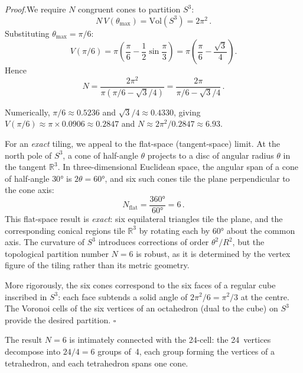 \documentclass[amsmath,amssymb,aps,prd,twocolumn,superscriptaddress,nofootinbib]{revtex4-2}
\begin{document}
\noindent\emph{Proof.}\quad  We require $N$ congruent cones to partition $S^3$:
\begin{equation}\label{eq:Ncones}
  N\, V(\theta_{\max}) = \mathrm{Vol}(S^3) = 2\pi^2\,.
\end{equation}
Substituting $\theta_{\max} = \pi/6$:
\begin{equation}\label{eq:V30}
  V(\pi/6) = \pi\!\left(\frac{\pi}{6}
  - \frac{1}{2}\sin\frac{\pi}{3}\right)
  = \pi\!\left(\frac{\pi}{6} - \frac{\sqrt{3}}{4}\right).
\end{equation}
Hence
\begin{equation}\label{eq:Nformula}
  N = \frac{2\pi^2}{\pi(\pi/6 - \sqrt{3}/4)}
    = \frac{2\pi}{\pi/6 - \sqrt{3}/4}\,.
\end{equation}

Numerically, $\pi/6 \approx 0.5236$ and $\sqrt{3}/4 \approx 0.4330$, giving
$V(\pi/6) \approx \pi \times 0.0906 \approx 0.2847$ and
$N \approx 2\pi^2/0.2847 \approx 6.93$.

For an \emph{exact} tiling, we appeal to the flat-space (tangent-space) limit.
At the north pole of $S^3$, a cone of half-angle $\theta$ projects to a disc
of angular radius $\theta$ in the tangent $\mathbb{R}^3$.  In three-dimensional
Euclidean space, the angular span of a cone of half-angle $30°$ is
$2\theta = 60°$, and six such cones tile the plane perpendicular to the cone
axis:
\begin{equation}\label{eq:flat}
  N_{\text{flat}} = \frac{360°}{60°} = 6\,.
\end{equation}
This flat-space result is \emph{exact}: six equilateral triangles tile the
plane, and the corresponding conical regions tile $\mathbb{R}^3$ by rotating
each by $60°$ about the common axis.  The curvature of $S^3$ introduces
corrections of order $\theta^2/R^2$, but the topological partition number
$N = 6$ is robust, as it is determined by the vertex figure of the tiling
rather than its metric geometry.

More rigorously, the six cones correspond to the six faces of a regular
cube inscribed in $S^3$: each face subtends a solid angle of
$2\pi^2/6 = \pi^2/3$ at the centre.  The Voronoi cells of the six vertices
of an octahedron (dual to the cube) on $S^3$ provide the desired partition.
\hfill$\square$

The result $N = 6$ is intimately connected with the 24-cell: the 24~vertices
decompose into $24/4 = 6$ groups of~4, each group forming the vertices of a
tetrahedron, and each tetrahedron spans one cone.
\end{document}
